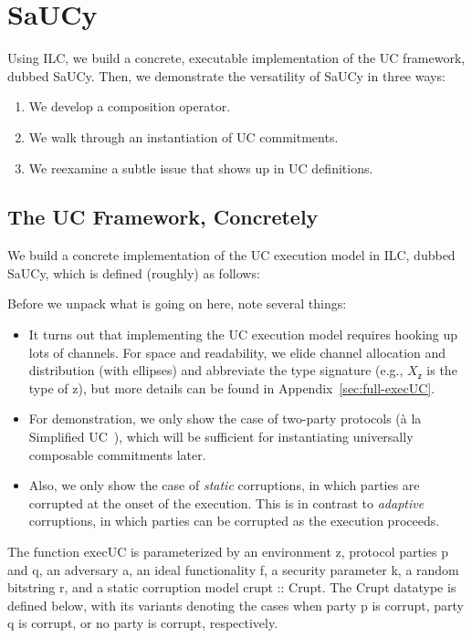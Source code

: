 \section{SaUCy}
\label{sec:saucy}

Using ILC, we build a concrete, executable implementation of the UC framework,
dubbed SaUCy. Then, we demonstrate the versatility of SaUCy in three ways:
\begin{enumerate}[leftmargin=*]
\item We develop a composition operator.
\item We walk through an instantiation of UC commitments.
\item We reexamine a subtle issue that shows up in UC definitions.
\end{enumerate}

\subsection{The UC Framework, Concretely}
\label{subsec:concrete-uc}

We build a concrete implementation of the UC execution model in ILC, dubbed
SaUCy, which is defined (roughly) as follows:



\noindent Before we unpack what is going on here, note several things:

\begin{itemize}[leftmargin=*]
  \item It turns out that implementing the UC execution model requires hooking
    up lots of channels. For space and readability, we elide channel allocation
    and distribution (with ellipses) and abbreviate the type signature (e.g.,
    $X_{\mathsf{z}}$ is the type of \textsf{z}), but more details can be found
    in Appendix~\ref{sec:full-execUC}.
  \item For demonstration, we only show the case of two-party protocols (\`{a}
    la Simplified UC~\cite{canetti2015simpler}), which will be sufficient for
    instantiating universally composable commitments later.
  \item Also, we only show the case of \emph{static} corruptions, in which
    parties are corrupted at the onset of the execution. This is in contrast to
    \emph{adaptive} corruptions, in which parties can be corrupted as the
    execution proceeds.
\end{itemize}

The function \textsf{execUC} is parameterized by an environment \textsf{z},
protocol parties \textsf{p} and \textsf{q}, an adversary \textsf{a}, an ideal
functionality \textsf{f}, a security parameter \textsf{k}, a random bitstring
\textsf{r}, and a static corruption model \textsf{crupt :: Crupt}. The
\textsf{Crupt} datatype is defined below, with its variants denoting the cases
when party \textsf{p} is corrupt, party \textsf{q} is corrupt, or no party is
corrupt, respectively.

